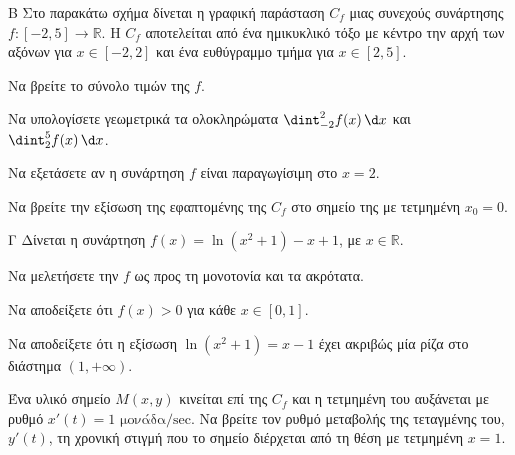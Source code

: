 \begin{thema}{Β}
Στο παρακάτω σχήμα δίνεται η γραφική παράσταση $C_f$ μιας συνεχούς συνάρτησης $f:[-2, 5]\to\mathbb{R}$. Η $C_f$ αποτελείται από ένα ημικυκλικό τόξο με κέντρο την αρχή των αξόνων για $x\in[-2,2]$ και ένα ευθύγραμμο τμήμα για $x\in[2,5]$.

\begin{center}
\end{center}

\begin{erwthma}
    \item Να βρείτε το σύνολο τιμών της $f$. 
    \item Να υπολογίσετε γεωμετρικά τα ολοκληρώματα $\dint_{-2}^{2} f(x)\,\d x$ και $\dint_{2}^{5} f(x)\,\d x$. 
    \item Να εξετάσετε αν η συνάρτηση $f$ είναι παραγωγίσιμη στο $x=2$. 
    \item Να βρείτε την εξίσωση της εφαπτομένης της $C_f$ στο σημείο της με τετμημένη $x_0 = 0$. 
\end{erwthma}
\end{thema}

\begin{thema}{Γ}
Δίνεται η συνάρτηση $f(x) = \ln(x^2+1) - x + 1$, με $x\in\mathbb{R}$.
\begin{erwthma}
    \item Να μελετήσετε την $f$ ως προς τη μονοτονία και τα ακρότατα. 
    \item Να αποδείξετε ότι $f(x) > 0$ για κάθε $x\in[0,1]$. 
    \item Να αποδείξετε ότι η εξίσωση $\ln(x^2+1) = x - 1$ έχει ακριβώς μία ρίζα στο διάστημα $(1,+\infty)$. 
    \item Ένα υλικό σημείο $M(x,y)$ κινείται επί της $C_f$ και η τετμημένη του αυξάνεται με ρυθμό $x'(t)=1 \text{ μονάδα/sec}$. Να βρείτε τον ρυθμό μεταβολής της τεταγμένης του, $y'(t)$, τη χρονική στιγμή που το σημείο διέρχεται από τη θέση με τετμημένη $x=1$. 
\end{erwthma}
\end{thema}

